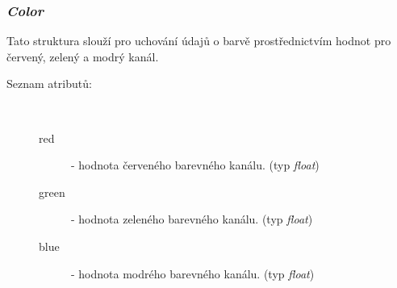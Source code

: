\documentclass{article}
\begin{document}
\subsubsection{\textit{Color}}
Tato struktura slouží pro uchování údajů o barvě prostřednictvím hodnot pro červený, zelený a modrý kanál.\\
\begin{description}
\item[Seznam atributů:] ~
\begin{description}
\item[red] - hodnota červeného barevného kanálu. (typ \textit{float})
\item[green] - hodnota zeleného barevného kanálu. (typ \textit{float})
\item[blue] - hodnota modrého barevného kanálu. (typ \textit{float})
\end{description}
\end{description}
\end{document}
